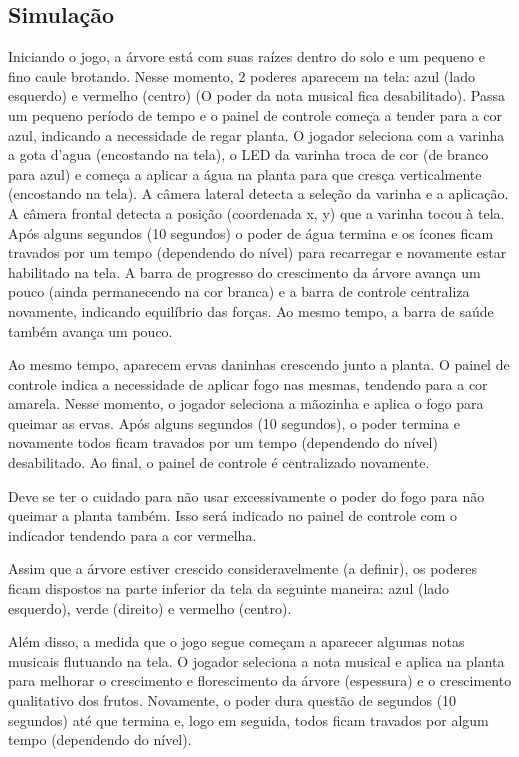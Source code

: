 \documentclass[12pt]{article}
\begin{document}
\subsection{Simula\c c\~ao}
Iniciando o jogo, a \'arvore est\'a com suas ra\'izes dentro do solo e um pequeno e fino caule
 brotando. Nesse momento, 2 poderes aparecem na tela: azul (lado esquerdo) e vermelho (centro)
 (O poder da nota musical fica desabilitado). Passa um pequeno per\'iodo de tempo e o painel
 de controle come\c ca a tender para a cor azul, indicando a necessidade de regar planta.
 O jogador seleciona com a varinha a gota d'agua (encostando na tela), o LED da varinha
 troca de cor (de branco para azul) e come\c ca a aplicar a \'agua na planta para que cres\c ca
 verticalmente (encostando na tela). A c\^amera lateral detecta a sele\c c\~ao da varinha e
 a aplica\c c\~ao. A c\^amera frontal detecta a posi\c c\~ao (coordenada x, y) que a varinha
 tocou \`a tela. Ap\'os alguns segundos (10 segundos) o poder de \'agua termina e os \'icones
 ficam travados por um tempo (dependendo do n\'ivel) para recarregar e novamente estar
 habilitado na tela. A barra de progresso do crescimento da \'arvore avança um pouco
 (ainda permanecendo na cor branca) e a barra de controle centraliza novamente, indicando
 equil\'ibrio das for\c cas. Ao mesmo tempo, a barra de sa\'ude tamb\'em avan\c ca um pouco.

 Ao mesmo tempo, aparecem ervas daninhas crescendo junto a planta. O painel de controle indica
 a necessidade de aplicar fogo nas mesmas, tendendo para a cor amarela. Nesse momento, o jogador
 seleciona a m\~aozinha e aplica o fogo para queimar as ervas. Ap\'os alguns segundos (10 segundos),
 o poder termina e novamente todos ficam travados por um tempo (dependendo do n\'ivel) desabilitado.
 Ao final, o painel de controle \'e centralizado novamente.
 
 Deve se ter o cuidado para n\~ao usar excessivamente o poder do fogo para n\~ao queimar a planta tamb\'em.
 Isso ser\'a indicado no painel de controle com o indicador tendendo para a cor vermelha.
 
 Assim que a \'arvore estiver crescido consideravelmente (a definir), os poderes ficam dispostos na parte
 inferior da tela da seguinte maneira: azul (lado esquerdo), verde (direito) e vermelho (centro).

 Al\'em disso, a medida que o jogo segue come\c cam a aparecer algumas notas musicais flutuando na tela.
 O jogador seleciona a nota musical e aplica na planta para melhorar o crescimento e florescimento da \'arvore
 (espessura) e o crescimento qualitativo dos frutos. Novamente, o poder dura quest\~ao de segundos
 (10 segundos) at\'e que termina e, logo em seguida, todos ficam travados por algum tempo (dependendo do n\'ivel).
\end{document}
